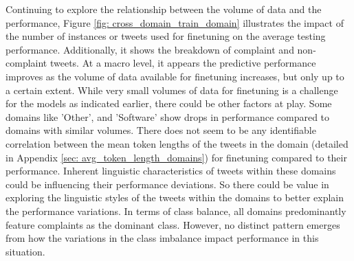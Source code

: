 Continuing to explore the relationship between the volume of data and the performance, Figure \ref{fig: cross_domain_train_domain} illustrates the impact of the number of instances or tweets used for finetuning on the average testing performance. Additionally, it shows the breakdown of complaint and non-complaint tweets. At a macro level, it appears the predictive performance improves as the volume of data available for finetuning increases, but only up to a certain extent. While very small volumes of data for finetuning is a challenge for the models as indicated earlier, there could be other factors at play. Some domains like 'Other', and 'Software' show drops in performance compared to domains with similar volumes. There does not seem to be any identifiable correlation between the mean token lengths of the tweets in the domain (detailed in Appendix \ref{sec: avg_token_length_domains}) for finetuning compared to their performance. Inherent linguistic characteristics of tweets within these domains could be influencing their performance deviations. So there could be value in exploring the linguistic styles of the tweets within the domains to better explain the performance variations. In terms of class balance, all domains predominantly feature complaints as the dominant class. However, no distinct pattern emerges from how the variations in the class imbalance impact performance in this situation. 